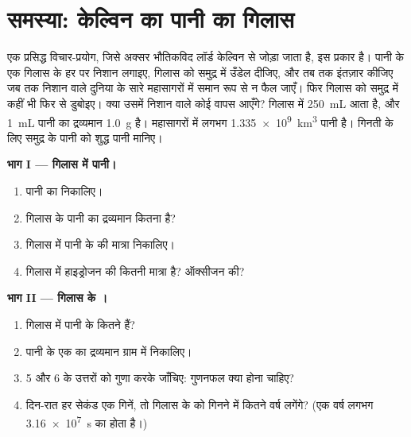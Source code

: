 \section{समस्या: केल्विन का पानी का गिलास}

\begin{problem}
\label{pb:g10:the-mole:1}
एक प्रसिद्ध विचार-प्रयोग, जिसे अक्सर भौतिकविद लॉर्ड केल्विन से जोड़ा जाता है,
इस प्रकार है। पानी के एक गिलास के हर  पर निशान लगाइए, गिलास को समुद्र में
उँडेल दीजिए, और तब तक इंतज़ार कीजिए जब तक निशान वाले  दुनिया के सारे
महासागरों में समान रूप से न फैल जाएँ। फिर गिलास को समुद्र में कहीं भी फिर से
डुबोइए। क्या उसमें निशान वाले कोई  वापस आएँगे? गिलास में
\qty{250}{mL} आता है, और \qty{1}{mL} पानी का द्रव्यमान \qty{1.0}{g} है।
महासागरों में लगभग \qty{1.335e9}{km^3} पानी है। गिनती के लिए समुद्र के पानी
को शुद्ध पानी मानिए।

\medskip
\noindent\textbf{भाग I --- गिलास में पानी।}
\begin{enumerate}
  \item पानी का  निकालिए।
  \item गिलास के पानी का द्रव्यमान कितना है?
  \item गिलास में पानी के  की मात्रा निकालिए।
  \item गिलास में हाइड्रोजन  की कितनी मात्रा है? ऑक्सीजन
         की?
\end{enumerate}

\medskip
\noindent\textbf{भाग II --- गिलास के ।}
\begin{enumerate}[resume]
  \item गिलास में पानी के कितने  हैं?
  \item पानी के एक  का द्रव्यमान ग्राम में निकालिए।
  \item 5 और 6 के उत्तरों को गुणा करके जाँचिए: गुणनफल क्या होना
        चाहिए?
  \item दिन-रात हर सेकंड एक  गिनें, तो गिलास के  को गिनने में कितने वर्ष
        लगेंगे? (एक वर्ष लगभग \qty{3.16e7}{s} का होता है।)
\end{enumerate}


\end{problem}
